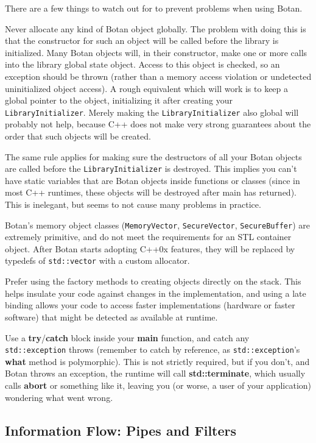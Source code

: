 \documentclass{article}
\newcommand{\function}[1]{\textbf{#1}}
\newcommand{\type}[1]{\texttt{#1}}
\begin{document}
There are a few things to watch out for to prevent problems when using Botan.

Never allocate any kind of Botan object globally. The problem with doing this
is that the constructor for such an object will be called before the library is
initialized. Many Botan objects will, in their constructor, make one or more
calls into the library global state object. Access to this object is checked,
so an exception should be thrown (rather than a memory access violation or
undetected uninitialized object access). A rough equivalent which will work is
to keep a global pointer to the object, initializing it after creating your
\type{LibraryInitializer}. Merely making the \type{LibraryInitializer} also
global will probably not help, because C++ does not make very strong guarantees
about the order that such objects will be created.

The same rule applies for making sure the destructors of all your Botan objects
are called before the \type{LibraryInitializer} is destroyed. This implies you
can't have static variables that are Botan objects inside functions or classes
(since in most C++ runtimes, these objects will be destroyed after main has
returned). This is inelegant, but seems to not cause many problems in practice.

Botan's memory object classes (\type{MemoryVector},
\type{SecureVector}, \type{SecureBuffer}) are extremely primitive, and
do not meet the requirements for an STL container object. After Botan
starts adopting C++0x features, they will be replaced by typedefs of
\type{std::vector} with a custom allocator.

Prefer using the factory methods to creating objects directly on the
stack. This helps insulate your code against changes in the
implementation, and using a late binding allows your code to access
faster implementations (hardware or faster software) that might be
detected as available at runtime.

Use a \function{try}/\function{catch} block inside your
\function{main} function, and catch any \type{std::exception} throws
(remember to catch by reference, as \type{std::exception}'s
\function{what} method is polymorphic). This is not strictly required,
but if you don't, and Botan throws an exception, the runtime will call
\function{std::terminate}, which usually calls \function{abort} or
something like it, leaving you (or worse, a user of your application)
wondering what went wrong.

\subsection{Information Flow: Pipes and Filters}
\end{document}

